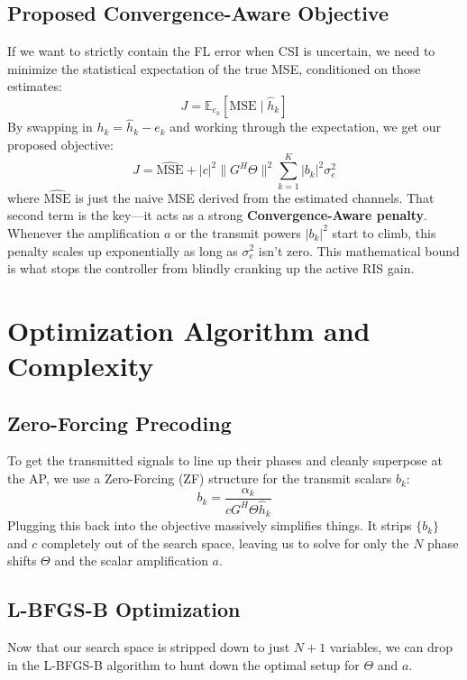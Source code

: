 \documentclass[lettersize,journal]{IEEEtran}
\begin{document}
\subsection{Proposed Convergence-Aware Objective}
If we want to strictly contain the FL error when CSI is uncertain, we need to minimize the statistical expectation of the true MSE, conditioned on those estimates:
\begin{equation}
J = \mathbb{E}_{e_k}[\text{MSE} \mid \hat{h}_k]
\end{equation}
By swapping in $h_k = \hat{h}_k - e_k$ and working through the expectation, we get our proposed objective:
\begin{equation}
J = \widehat{\text{MSE}} + |c|^2 \|G^H \Theta\|^2 \sum_{k=1}^K |b_k|^2 \sigma_e^2
\end{equation}
where $\widehat{\text{MSE}}$ is just the naive MSE derived from the estimated channels. That second term is the key---it acts as a strong \textbf{Convergence-Aware penalty}. Whenever the amplification $a$ or the transmit powers $|b_k|^2$ start to climb, this penalty scales up exponentially as long as $\sigma_e^2$ isn't zero. This mathematical bound is what stops the controller from blindly cranking up the active RIS gain.

\section{Optimization Algorithm and Complexity}

\subsection{Zero-Forcing Precoding}
To get the transmitted signals to line up their phases and cleanly superpose at the AP, we use a Zero-Forcing (ZF) structure for the transmit scalars $b_k$:
\begin{equation}
b_k = \frac{\alpha_k}{c G^H \Theta \hat{h}_k}
\end{equation}
Plugging this back into the objective massively simplifies things. It strips $\{b_k\}$ and $c$ completely out of the search space, leaving us to solve for only the $N$ phase shifts $\Theta$ and the scalar amplification $a$.

\subsection{L-BFGS-B Optimization}
Now that our search space is stripped down to just $N+1$ variables, we can drop in the L-BFGS-B algorithm to hunt down the optimal setup for $\Theta$ and $a$.
\end{document}
